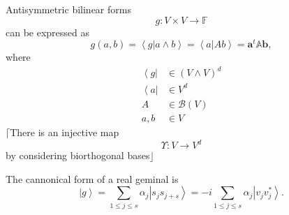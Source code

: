 \documentclass[aps,preprint]{revtex4}%
\begin{document}
Antisymmetric bilinear forms
\begin{equation}
g:V\times V\rightarrow\mathbb{F}%
\end{equation}
can be expressed as
\begin{equation}
g\left(  a,b\right)  =\left\langle g\left\vert a\wedge b\right.  \right\rangle
=\left\langle a\left\vert Ab\right.  \right\rangle =\mathbf{a}^{t}%
\mathbb{A}\mathbf{b},
\end{equation}
where
\begin{align}
\left\langle g\right\vert  &  \in\left(  V\wedge V\right)  ^{d}\\
\left\langle a\right\vert  &  \in V^{d}\\
A &  \in\mathcal{B}\left(  V\right)  \\
a,b &  \in V
\end{align}
$\lceil$There is an injective map
\begin{equation}
\Upsilon:V\rightarrow V^{d}%
\end{equation}
by considering biorthogonal bases$\rfloor$

The cannonical form of a real geminal is
\begin{equation}
\left\vert g\right\rangle =\sum\limits_{1\leq j\leq s}\alpha_{j}\left\vert
s_{j}s_{j+s}\right\rangle =-i\sum_{1\leq j\leq s}\alpha_{j}\left\vert
v_{j}v_{j}^{\ast}\right\rangle .
\end{equation}


\bigskip%
\end{document}
